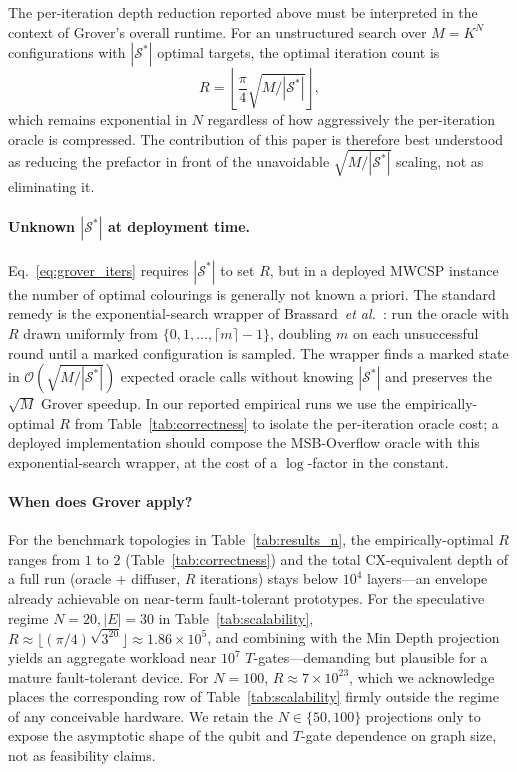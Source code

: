 \documentclass{ieeeaccess}
\begin{document}
The per-iteration depth reduction reported above must be interpreted in the context of Grover's overall runtime. For an unstructured search over $M = K^N$ configurations with $|\mathcal{S}^*|$ optimal targets, the optimal iteration count is
\begin{equation}
R = \left\lfloor \frac{\pi}{4} \sqrt{M / |\mathcal{S}^*|} \right\rfloor,
\label{eq:grover_iters}
\end{equation}
which remains exponential in $N$ regardless of how aggressively the per-iteration oracle is compressed. The contribution of this paper is therefore best understood as reducing the prefactor in front of the unavoidable $\sqrt{M / |\mathcal{S}^*|}$ scaling, not as eliminating it.

\paragraph{Unknown $|\mathcal{S}^*|$ at deployment time.}
Eq.~\eqref{eq:grover_iters} requires $|\mathcal{S}^*|$ to set $R$, but in a deployed MWCSP instance the number of optimal colourings is generally not known a priori. The standard remedy is the exponential-search wrapper of Brassard~\textit{et al.}~\cite{brassard2002}: run the oracle with $R$ drawn uniformly from $\{0, 1, \dots, \lceil m \rceil - 1\}$, doubling $m$ on each unsuccessful round until a marked configuration is sampled. The wrapper finds a marked state in $\mathcal{O}(\sqrt{M/|\mathcal{S}^*|})$ expected oracle calls without knowing $|\mathcal{S}^*|$ and preserves the $\sqrt{M}$ Grover speedup. In our reported empirical runs we use the empirically-optimal $R$ from Table~\ref{tab:correctness} to isolate the per-iteration oracle cost; a deployed implementation should compose the MSB-Overflow oracle with this exponential-search wrapper, at the cost of a $\log$-factor in the constant.

\paragraph{When does Grover apply?}
For the benchmark topologies in Table~\ref{tab:results_n}, the empirically-optimal $R$ ranges from $1$ to $2$ (Table~\ref{tab:correctness}) and the total CX-equivalent depth of a full run (oracle + diffuser, $R$ iterations) stays below $10^4$ layers---an envelope already achievable on near-term fault-tolerant prototypes. For the speculative regime $N{=}20, |E|{=}30$ in Table~\ref{tab:scalability}, $R \approx \lfloor (\pi/4)\sqrt{3^{20}} \rfloor \approx 1.86 \times 10^5$, and combining with the Min Depth projection yields an aggregate workload near $10^7$ $T$-gates---demanding but plausible for a mature fault-tolerant device. For $N{=}100$, $R \approx 7 \times 10^{23}$, which we acknowledge places the corresponding row of Table~\ref{tab:scalability} firmly outside the regime of any conceivable hardware. We retain the $N \in \{50, 100\}$ projections only to expose the asymptotic shape of the qubit and $T$-gate dependence on graph size, not as feasibility claims.
\end{document}
